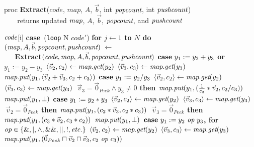 \begin{algorithm}
proc {\bf Extract}($code$, $map$, $A$, $\vec b$, int $\mbox{\it popcount}$, int $\mbox{\it pushcount}$) \\
\verb+   + returns updated $\mbox{\it map}$, $A$, ${\vec b}$, $\mbox{\it popcount}$, and $\mbox{\it pushcount}$ \\ \vspace{-12pt}
\begin{algorithmic}
 $\mbox{\it code}$[i]
\IND
\STATE \mbox{\bf case}~({\tt loop} N $code'$)
\IND
\STATE \bf{for} $j \leftarrow 1$ to $N$ {\bf do}
\IND
\STATE $(\mbox{\it map}, A, {\vec b}, \mbox{\it popcount}, \mbox{\it pushcount})~\leftarrow~$ \\
\verb+   +\bf{Extract}$(\mbox{\it code}, \mbox{\it map}, A, {\vec b}, \mbox{\it popcount}, \mbox{\it pushcount})$
\UND
\UND
\STATE \vspace{-6pt}
\STATE $\mbox{\bf case}~ y_1 := y_2 + y_3$ or $y_1 := y_2 - y_3$
\IND
\STATE $\langle{\vec v_2}, {c_2}\rangle \leftarrow \mbox{\it map}.\mbox{\it get}(y_2)$
\STATE $\langle{\vec v_3}, {c_3}\rangle \leftarrow \mbox{\it map}.\mbox{\it get}(y_3)$
\STATE $\mbox{\it map}.\mbox{\it put}(y_1, \langle{\vec v_2+\vec v_3}, {c_2+c_3}\rangle)$
\UND
\STATE \vspace{-6pt}
\STATE $\mbox{\bf case}~y_1 := y_2 / y_3$
\IND
\STATE $\langle{\vec v_2}, {c_2}\rangle \leftarrow \mbox{\it map}.\mbox{\it get}(y_2)$
\STATE $\langle{\vec v_3}, {c_3}\rangle \leftarrow \mbox{\it map}.\mbox{\it get}(y_3)$
 $~\vec v_3 = \vec 0_{Peek} \wedge y_3 \ne 0$ {\bf then}
\IND
\STATE $\mbox{\it map}.\mbox{\it put}(y_1, (\frac{1}{c_3}*\vec v_2, c_2/c_3))$
\UND
{}
\IND
\STATE $\mbox{\it map}.\mbox{\it put}(y_1, \bot)$
\UND
\UND
\STATE \vspace{-6pt}
\STATE $\mbox{\bf case}~y_1 := y_2 * y_3$
\IND
\STATE $\langle{\vec v_2}, {c_2}\rangle \leftarrow \mbox{\it map}.\mbox{\it get}(y_2)$
\STATE $\langle{\vec v_3}, {c_3}\rangle \leftarrow \mbox{\it map}.\mbox{\it get}(y_3)$
 $~\vec v_2 = \vec 0_{Peek}$ {\bf then}
\IND
\STATE $\mbox{\it map}.\mbox{\it put}(y_1, (c_2*\vec v_3, c_2*c_3))$
\UND
{} $~\vec v_3=\vec 0_{Peek}$ {\bf then}
\IND
\STATE $\mbox{\it map}.\mbox{\it put}(y_1, (c_3*\vec v_2, c_3*c_2))$
\UND
{}
\IND
\STATE $\mbox{\it map}.\mbox{\it put}(y_1, \bot)$
\UND
\UND
\STATE \vspace{-6pt}
\STATE $\mbox{\bf case}~y_1 := y_2 ~\mbox{\it op}~ y_3$, for $\mbox{\it op} \in \{\&, |, \wedge, \&\&, ||, !, \mbox{\it etc.}\}$
\IND
\STATE $\langle{\vec v_2}, {c_2}\rangle \leftarrow \mbox{\it map}.\mbox{\it get}(y_2)$
\STATE $\langle{\vec v_3}, {c_3}\rangle \leftarrow \mbox{\it map}.\mbox{\it get}(y_3)$
\STATE $\mbox{\it map}.\mbox{\it put}(y_1, (\vec 0_{Peek} \sqcap \vec v_2 \sqcap \vec v_3, c_2 ~\mbox{\it op}~ c_3))$
\UND
\STATE \vspace{-6pt}

\end{algorithmic}
\end{algorithm}
